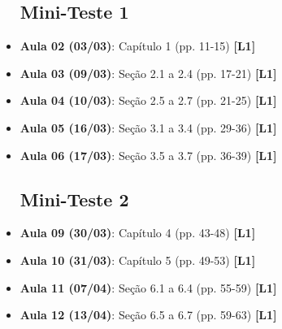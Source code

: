 \documentclass[12pt,a4paper,oneside]{article}
\begin{document}
\begin{itemize}
	
	\subsection{Mini-Teste 1}
	
	\item[] {\bf Aula 02 (03/03)}: Capítulo 1 (pp. 11-15) {\bf \color{blue} [L1]}
	\item[] {\bf Aula 03 (09/03)}: Seção 2.1 a 2.4 (pp. 17-21) {\bf \color{blue} [L1]}
	\item[] {\bf Aula 04 (10/03)}: Seção 2.5 a 2.7 (pp. 21-25) {\bf \color{blue} [L1]}
	\item[] {\bf Aula 05 (16/03)}: Seção 3.1 a 3.4 (pp. 29-36) {\bf \color{blue} [L1]}
	\item[] {\bf Aula 06 (17/03)}: Seção 3.5 a 3.7 (pp. 36-39) {\bf \color{blue} [L1]}
	
	\subsection{Mini-Teste 2}
	
	\item[] {\bf Aula 09 (30/03)}: Capítulo 4 (pp. 43-48) {\bf \color{blue} [L1]}
	\item[] {\bf Aula 10 (31/03)}: Capítulo 5 (pp. 49-53) {\bf \color{blue} [L1]}
	\item[] {\bf Aula 11 (07/04)}: Seção 6.1 a 6.4 (pp. 55-59) {\bf \color{blue} [L1]}
	\item[] {\bf Aula 12 (13/04)}: Seção 6.5 a 6.7 (pp. 59-63) {\bf \color{blue} [L1]}
%	
%	
%	
%	
	
\end{itemize}
\end{document}
